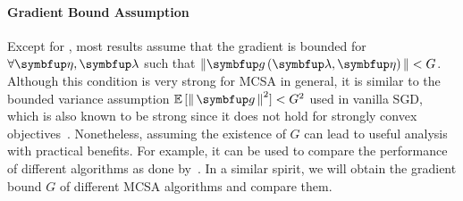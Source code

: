 \vspace{-0.05in}
\paragraph{Gradient Bound Assumption}
Except for \citet{doan_finitetime_2020}, most results assume that the gradient is bounded for \(\forall\veta,\vlambda\) such that \( {\| \vg\left(\vlambda, \veta\right) \|} < G \).
Although this condition is very strong for MCSA in general, it is similar to the bounded variance assumption \(\mathbb{E}\,[\norm{\vg}^2]  < G^2\) used in vanilla SGD, which is also known to be strong since it does not hold for strongly convex objectives~\citep{pmlr-v80-nguyen18c}.
Nonetheless, assuming the existence of \(G\) can lead to useful analysis with practical benefits.
For example, it can be used to compare the performance of different algorithms as done by~\citet{pmlr-v108-geffner20a}.
In a similar spirit, we will obtain the gradient bound \(G\) of different MCSA algorithms and compare them.

%




